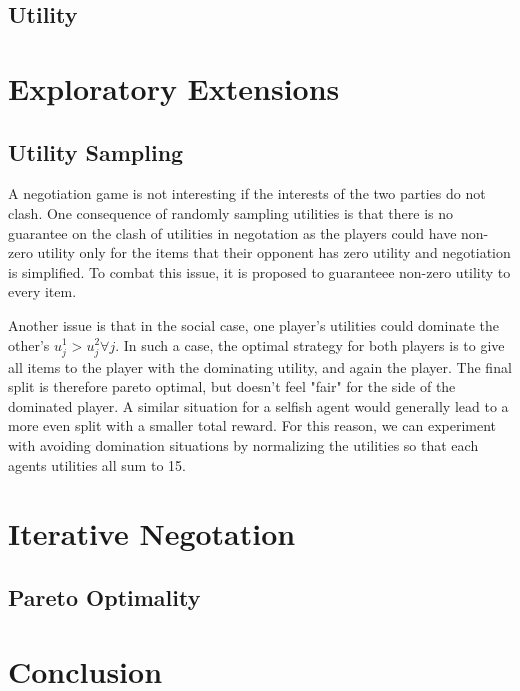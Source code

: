\documentclass{article}
\begin{document}
\subsection{Utility }%
\label{sub:utility_}



\section{Exploratory Extensions}%
\label{sec:exploratory_experiments}

\subsection{Utility Sampling}%
\label{sub:utility_sampling}
A negotiation game is not interesting if the interests of the two parties do not
clash. One consequence of randomly sampling utilities is that there is no
guarantee on the clash of utilities in negotation as the players could have
non-zero utility only for the items that their opponent has zero utility and
negotiation is simplified. To combat this issue, it is proposed to guaranteee
non-zero utility to every item.

Another issue is that in the social case, one player's utilities could dominate
the other's $u_j^1 > u_j^2 \forall j$. In such a case, the optimal strategy for
both players is to give all items to the player with the dominating utility, and
again the player. The final split is therefore pareto optimal, but doesn't feel
"fair" for the side of the dominated player. A similar situation for a selfish
agent would generally lead to a more even split with a smaller total reward. For
this reason, we can experiment with avoiding domination situations by
normalizing the utilities so that each agents utilities all sum to 15.

\section{Iterative Negotation}%
\label{sec:iterative_negotation}

\subsection{Pareto Optimality}%
\label{sub:pareto_optimality}

\section{Conclusion}%
\label{sec:conclusion}
\end{document}
